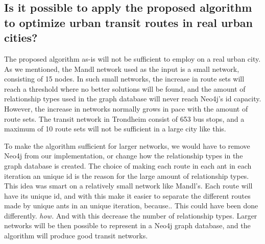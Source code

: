 

\subsection{ Is it possible to apply the proposed algorithm to optimize urban transit routes in real urban cities?}

The proposed algorithm as-is will not be sufficient to employ on a real urban city. As we mentioned, the Mandl network used as the input is a small network, consisting of 15 nodes. In such small networks, the increase in route sets will reach a threshold where no better solutions will be found, and the amount of relationship types used in the graph database will never reach Neo4j's id capacity. However, the increase in networks normally grows in pace with the amount of route sets. The transit network in Trondheim consist of 653 bus stops\citep{website:rutebok}, and a maximum of 10 route sets will not be sufficient in a large city like this. %

To make the algorithm sufficient for larger networks, we would have to remove Neo4j from our implementation, or change how the relationship types in the graph database is created. The choice of making each route in each ant in each iteration an unique id is the reason for the large amount of relationship types. This idea was smart on a relatively small network like Mandl's. Each route will have its unique id, and with this make it easier to separate the different routes made by unique ants in an unique iteration, because.. This could have been done differently. \emph{\color{blue} how.} And with this decrease the number of relationship types. Larger networks will be then possible to represent in a Neo4j graph database, and the algorithm will produce good transit networks.

